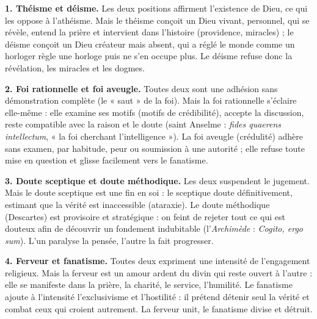 \documentclass[11pt]{article}
\begin{document}
\begin{corrige}
\textbf{1. Théisme et déisme.} Les deux positions affirment l'existence de Dieu, ce qui les oppose à l'athéisme. Mais le théisme conçoit un Dieu vivant, personnel, qui se révèle, entend la prière et intervient dans l'histoire (providence, miracles) ; le déisme conçoit un Dieu créateur mais absent, qui a réglé le monde comme un horloger règle une horloge puis ne s'en occupe plus. Le déisme refuse donc la révélation, les miracles et les dogmes.

\textbf{2. Foi rationnelle et foi aveugle.} Toutes deux sont une adhésion sans démonstration complète (le « saut » de la foi). Mais la foi rationnelle s'éclaire elle-même : elle examine ses motifs (motifs de crédibilité), accepte la discussion, reste compatible avec la raison et le doute (saint Anselme : \emph{fides quaerens intellectum}, « la foi cherchant l'intelligence »). La foi aveugle (crédulité) adhère sans examen, par habitude, peur ou soumission à une autorité ; elle refuse toute mise en question et glisse facilement vers le fanatisme.

\textbf{3. Doute sceptique et doute méthodique.} Les deux suspendent le jugement. Mais le doute sceptique est une fin en soi : le sceptique doute définitivement, estimant que la vérité est inaccessible (ataraxie). Le doute méthodique (Descartes) est provisoire et stratégique : on feint de rejeter tout ce qui est douteux afin de découvrir un fondement indubitable (l'\emph{Archimède} : \emph{Cogito, ergo sum}). L'un paralyse la pensée, l'autre la fait progresser.

\textbf{4. Ferveur et fanatisme.} Toutes deux expriment une intensité de l'engagement religieux. Mais la ferveur est un amour ardent du divin qui reste ouvert à l'autre : elle se manifeste dans la prière, la charité, le service, l'humilité. Le fanatisme ajoute à l'intensité l'exclusivisme et l'hostilité : il prétend détenir seul la vérité et combat ceux qui croient autrement. La ferveur unit, le fanatisme divise et détruit.
\end{corrige}
\end{document}
